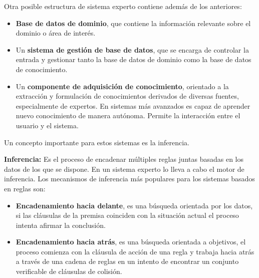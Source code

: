 \documentclass[12pt, twoside, openright]{report} %
\begin{document}
Otra posible estructura de sistema experto contiene además de los anteriores:
\begin{itemize}
	\item \textbf{Base de datos de dominio}, que contiene la información relevante sobre el dominio o área de interés.
	\item Un \textbf{sistema de gestión de base de datos}, que se encarga de controlar la entrada y gestionar tanto la base de datos de dominio como la base de datos de conocimiento.
	\item Un \textbf{componente de adquisición de conocimiento}, orientado a la extracción y formulación de conocimientos derivados de diversas fuentes, especialmente de expertos. En sistemas más avanzados es capaz de aprender nuevo conocimiento de manera autónoma. Permite la interacción entre el usuario y el sistema.
\end{itemize}

Un concepto importante para estos sistemas es la inferencia.

\textbf{Inferencia:} Es el proceso de encadenar múltiples reglas juntas basadas en los datos de los que se dispone. En un sistema experto lo lleva a cabo el motor de inferencia. Los mecanismos de inferencia más populares para los sistemas basados en reglas son:
\begin{itemize}
	\item \textbf{Encadenamiento hacia delante}, es una búsqueda orientada por los datos, si las cláusulas de la premisa coinciden con la situación actual el proceso intenta afirmar la conclusión.
	\item \textbf{Encadenamiento hacia atrás}, es una búsqueda orientada a objetivos, el proceso comienza con la cláusula de acción de una regla y trabaja hacia atrás a través de una cadena de reglas en un intento de encontrar un conjunto verificable de cláusulas de colisión.
\end{itemize}
\end{document}
